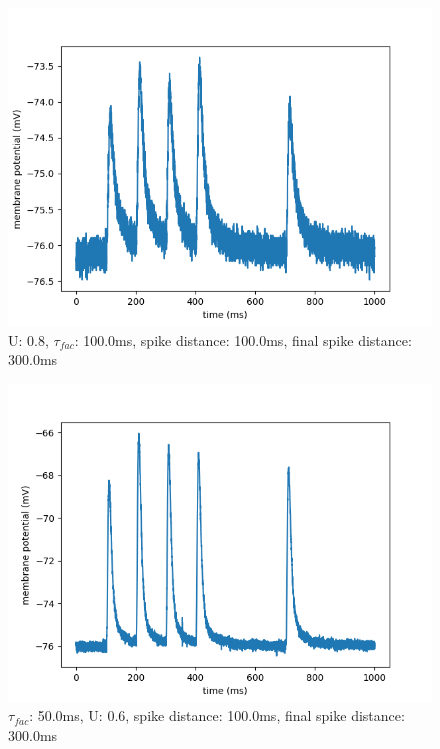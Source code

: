 \documentclass[10pt,a4paper]{scrartcl}
\begin{document}
\begin{figure} [ht]
\begin{center}
\label{fig:abb29}
\caption{U: 0.8, $\tau_{fac}$: 100.0ms, spike distance: 100.0ms, final spike distance: 300.0ms}
\includegraphics[scale=0.35]{pictures/final_spike_variation_18.pdf} 
\end{center}
\end{figure}

\newpage

\begin{figure} [ht]
\begin{center}
\label{fig:abb30}
\caption{$\tau_{fac}$: 50.0ms, U: 0.6, spike distance: 100.0ms, final spike distance: 300.0ms}
\includegraphics[scale=0.35]{pictures/final_spike_variation_19.pdf} 
\end{center}
\end{figure}
\end{document}
